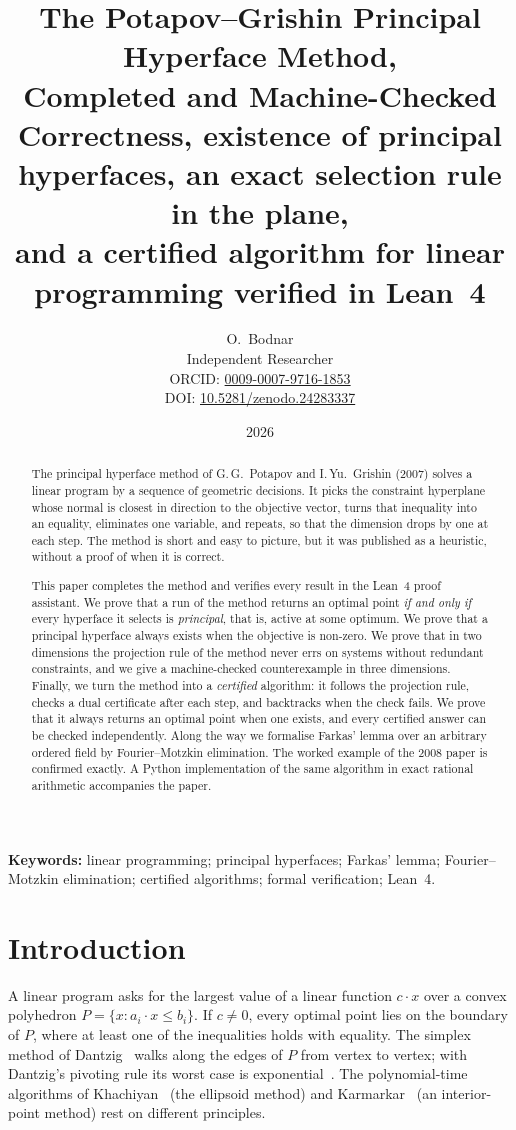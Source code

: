 \documentclass[11pt,a4paper]{article}
\title{\textbf{The Potapov--Grishin Principal Hyperface Method,\\Completed and Machine-Checked}\\[6pt]
\large Correctness, existence of principal hyperfaces, an exact selection rule in the plane,\\
and a certified algorithm for linear programming verified in Lean~4}
\author{O.~Bodnar\\[2pt]\small Independent Researcher\\
\small ORCID: \href{https://orcid.org/0009-0007-9716-1853}{0009-0007-9716-1853}\\
\small DOI: \href{https://doi.org/10.5281/zenodo.24283337}{10.5281/zenodo.24283337}}
\date{2026}
\theoremstyle{plain}
\theoremstyle{definition}
\theoremstyle{remark}
\begin{document}
\maketitle

\begin{abstract}
\noindent
The principal hyperface method of G.\,G.~Potapov and I.\,Yu.~Grishin (2007) solves a linear
program by a sequence of geometric decisions. It picks the constraint hyperplane whose normal
is closest in direction to the objective vector, turns that inequality into an equality,
eliminates one variable, and repeats, so that the dimension drops by one at each step. The
method is short and easy to picture, but it was published as a heuristic, without a proof of
when it is correct.

This paper completes the method and verifies every result in the Lean~4 proof assistant. We
prove that a run of the method returns an optimal point \emph{if and only if} every hyperface
it selects is \emph{principal}, that is, active at some optimum. We prove that a principal
hyperface always exists when the objective is non-zero. We prove that in two dimensions the
projection rule of the method never errs on systems without redundant constraints, and we give
a machine-checked counterexample in three dimensions. Finally, we turn the method into a
\emph{certified} algorithm: it follows the projection rule, checks a dual certificate after
each step, and backtracks when the check fails. We prove that it always returns an optimal point
when one exists, and every certified answer can be checked independently. Along the way we
formalise Farkas' lemma over an arbitrary ordered field by Fourier--Motzkin elimination. The
worked example of the 2008 paper is confirmed exactly. A Python implementation of the same
algorithm in exact rational arithmetic accompanies the paper.
\end{abstract}

\medskip
\noindent\textbf{Keywords:} linear programming; principal hyperfaces; Farkas' lemma;
Fourier--Motzkin elimination; certified algorithms; formal verification; Lean~4.

\section{Introduction}\label{sec:intro}

A linear program asks for the largest value of a linear function $c\cdot x$ over a convex
polyhedron $P=\{x : a_i\cdot x\le b_i\}$. If $c\ne0$, every optimal point lies on the boundary
of $P$, where at least one of the inequalities holds with equality. The simplex method of
Dantzig~\cite{dantzig1963} walks along the edges of $P$ from vertex to vertex; with Dantzig's
pivoting rule its worst case is exponential~\cite{kleeminty1972}. The polynomial-time algorithms
of Khachiyan~\cite{khachiyan1979} (the ellipsoid method) and Karmarkar~\cite{karmarkar1984} (an
interior-point method) rest on different principles.
\end{document}
